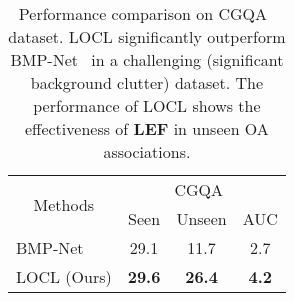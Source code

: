 \documentclass{bmvc2k}
\newcommand{\tablelightgray}{\rowcolor[gray]{.95}}
\begin{document}
\begin{table}[h]
\centering
\begin{tabular}{l|ccc}
\multicolumn{1}{c|}{\multirow{2}{*}{Methods}} & \multicolumn{3}{c}{CGQA~\cite{naeem2021learning}}                      \\
\multicolumn{1}{c|}{}                         & \multicolumn{1}{c|}{Seen} & \multicolumn{1}{c|}{Unseen} & AUC          \\ \hline
\tablelightgray BMP-Net~\cite{xu2021relation} & \multicolumn{1}{c|}{29.1} & \multicolumn{1}{c|}{11.7}   & 2.7          \\
LOCL (Ours)                                   & \multicolumn{1}{c|}{\textbf{29.6}} & \multicolumn{1}{c|}{\textbf{26.4}}   & \textbf{4.2}
\end{tabular}
\vspace{0.1cm} 
\caption{Performance comparison on CGQA~\cite{naeem2021learning} dataset. LOCL significantly outperform BMP-Net~\cite{xu2021relation} in a challenging (significant background clutter) dataset. The performance of LOCL shows the effectiveness of \textbf{LEF} in unseen OA associations.}
\label{tab:bmpnet}
\vspace{-0.4cm}
\end{table} 
\end{document}
